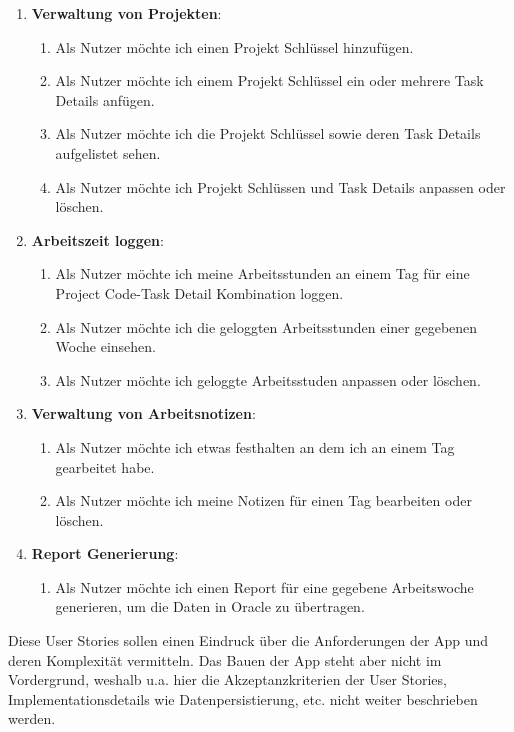 \documentclass[oneside,bibliography=totocnumbered,BCOR=5mm]{scrbook}
\begin{document}
\begin{enumerate}
  \item \textbf{Verwaltung von Projekten}:
    \begin{enumerate}
      \item Als Nutzer möchte ich einen Projekt Schlüssel hinzufügen.
      \item Als Nutzer möchte ich einem Projekt Schlüssel ein oder mehrere Task Details anfügen.
      \item Als Nutzer möchte ich die Projekt Schlüssel sowie deren Task Details aufgelistet sehen.
      \item Als Nutzer möchte ich Projekt Schlüssen und Task Details anpassen oder löschen.
    \end{enumerate}
  \item \textbf{Arbeitszeit loggen}:
    \begin{enumerate}
      \item Als Nutzer möchte ich meine Arbeitsstunden an einem Tag für eine Project Code-Task Detail Kombination loggen.
      \item Als Nutzer möchte ich die geloggten Arbeitsstunden einer gegebenen Woche einsehen.
      \item Als Nutzer möchte ich geloggte Arbeitsstuden anpassen oder löschen.
    \end{enumerate}
  \item \textbf{Verwaltung von Arbeitsnotizen}:
    \begin{enumerate}
      \item Als Nutzer möchte ich etwas festhalten an dem ich an einem Tag gearbeitet habe.
      \item Als Nutzer möchte ich meine Notizen für einen Tag bearbeiten oder löschen.
    \end{enumerate}
  \item \textbf{Report Generierung}:
    \begin{enumerate}
      \item Als Nutzer möchte ich einen Report für eine gegebene Arbeitswoche generieren, um die Daten in Oracle zu übertragen.
    \end{enumerate}
\end{enumerate}

Diese User Stories sollen einen Eindruck über die Anforderungen der App
und deren Komplexität vermitteln. Das Bauen der App steht aber nicht im
Vordergrund, weshalb u.a. hier die Akzeptanzkriterien der User Stories,
Implementationsdetails wie Datenpersistierung, etc. nicht weiter beschrieben
werden.
\end{document}
